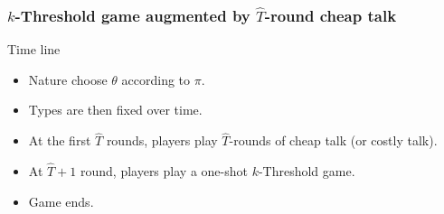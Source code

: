\documentclass[8pt]{beamer}
\begin{document}
\begin{frame}
  \frametitle{$k$-Threshold game augmented by $\hat{T}$-round cheap talk}

Time line
\begin{itemize}

\item Nature choose $\theta$ according to $\pi$.
\item Types are then fixed over time.
\item At the first $\hat{T}$ rounds, players play $\hat{T}$-rounds of cheap talk (or costly talk).
\item At $\hat{T}+1$ round, players play a one-shot $k$-Threshold game.
\item Game ends.
\end{itemize}

\end{frame}






%
%
%
\end{document}
